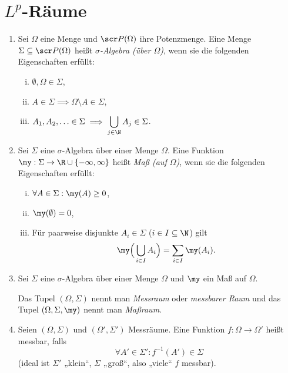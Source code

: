 
\chapter{\texorpdfstring{$L^p$}{L\textasciicircum p}-Räume}


\begin{df} \label{2.1}
	\begin{enumerate}[1)]
		\item
			Sei $\Omega$ eine Menge und $\scr P(\Omega)$ ihre Potenzmenge.
			Eine Menge $\Sigma \subset \scr P(\Omega)$ heißt \emph{$\sigma$-Algebra (über $\Omega$)}, wenn sie die folgenden Eigenschaften erfüllt:
			\begin{enumerate}[(i)]
				\item
					$\displaystyle \emptyset, \Omega \in \Sigma$,
				\item
					$\displaystyle A \in \Sigma \implies \Omega \setminus A \in \Sigma$,
				\item
					$\displaystyle A_1, A_2, \dotsc \in \Sigma \implies \bigcup_{j\in \N} A_j \in \Sigma$.
			\end{enumerate}
		\item
			Sei $\Sigma$ eine $\sigma$-Algebra über einer Menge $\Omega$.
			Eine Funktion $\my : \Sigma \to \R \cup \{-\infty, \infty\}$ heißt \emph{Maß (auf $\Omega$)}, wenn sie die folgenden Eigenschaften erfüllt:
			\begin{enumerate}[(i)]
				\item
					$\displaystyle \forall A \in \Sigma : \my(A) \ge 0$,
				\item
					$\displaystyle \my(\emptyset) = 0$,
				\item
					Für paarweise disjunkte $A_i \in \Sigma$ ($i \in I \subset \N$) gilt
					\[
						\my\Big(\bigcup_{i\in I} A_i\Big) = \sum_{i \in I} \my(A_i).
					\]
			\end{enumerate}
		\item
			Sei $\Sigma$ eine $\sigma$-Algebra über einer Menge $\Omega$ und $\my$ ein Maß auf $\Omega$.

			Das Tupel $(\Omega, \Sigma)$ nennt man \emph{Messraum} oder \emph{messbarer Raum} und das Tupel $(\Omega, \Sigma, \my)$ nennt man \emph{Maßraum}.
		\item
			Seien $(\Omega, \Sigma)$ und $(\Omega', \Sigma')$ Messräume.
			Eine Funktion $f: \Omega \to \Omega'$ heißt messbar, falls
			\[
				\forall A' \in \Sigma' : f^{-1}(A') \in \Sigma
			\]
			(ideal ist $\Sigma'$ „klein“, $\Sigma$ „groß“, also „viele“ $f$ messbar).
	\end{enumerate}
\end{df}

